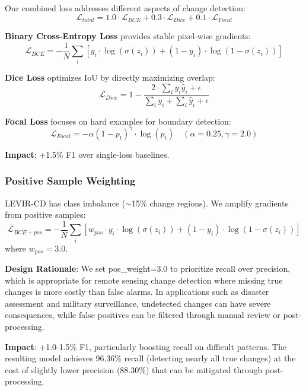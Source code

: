 \documentclass[journal]{IEEEtran}
\begin{document}
Our combined loss addresses different aspects of change detection:
\begin{equation}
\mathcal{L}_{total} = 1.0 \cdot \mathcal{L}_{BCE} + 0.3 \cdot \mathcal{L}_{Dice} + 0.1 \cdot \mathcal{L}_{Focal}
\end{equation}

\textbf{Binary Cross-Entropy Loss} provides stable pixel-wise gradients:
\begin{equation}
\mathcal{L}_{BCE} = -\frac{1}{N} \sum_{i} \left[ y_i \cdot \log(\sigma(z_i)) + (1-y_i) \cdot \log(1-\sigma(z_i)) \right]
\end{equation}

\textbf{Dice Loss} optimizes IoU by directly maximizing overlap:
\begin{equation}
\mathcal{L}_{Dice} = 1 - \frac{2 \cdot \sum_{i} y_i \hat{y}_i + \epsilon}{\sum_{i} y_i + \sum_{i} \hat{y}_i + \epsilon}
\end{equation}

\textbf{Focal Loss} focuses on hard examples for boundary detection:
\begin{equation}
\mathcal{L}_{Focal} = -\alpha (1-p_t)^\gamma \cdot \log(p_t) \quad (\alpha=0.25, \gamma=2.0)
\end{equation}

\textbf{Impact}: +1.5\% F1 over single-loss baselines.

\subsubsection{Positive Sample Weighting}

LEVIR-CD has class imbalance ($\sim$15\% change regions). We amplify gradients from positive samples:
\begin{equation}
\mathcal{L}_{BCE+pos} = -\frac{1}{N} \sum_{i} \left[ w_{pos} \cdot y_i \cdot \log(\sigma(z_i)) + (1-y_i) \cdot \log(1-\sigma(z_i)) \right]
\end{equation}
where $w_{pos} = 3.0$.

\textbf{Design Rationale}: We set pos\_weight=3.0 to prioritize recall over precision, which is appropriate for remote sensing change detection where missing true changes is more costly than false alarms. In applications such as disaster assessment and military surveillance, undetected changes can have severe consequences, while false positives can be filtered through manual review or post-processing.

\textbf{Impact}: +1.0-1.5\% F1, particularly boosting recall on difficult patterns. The resulting model achieves 96.36\% recall (detecting nearly all true changes) at the cost of slightly lower precision (88.30\%) that can be mitigated through post-processing.
\end{document}
